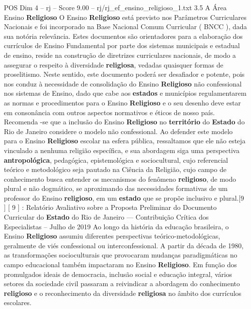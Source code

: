 \begin{textsample}{POS Dim 4 – rj – Score 9.00 – rj/rj\_ef\_ensino\_religioso\_1.txt}  \label{ex:f4_pos_165}
3.5 A Área Ensino \textbf{Religioso} O Ensino \textbf{Religioso} está previsto nos Parâmetros Curriculares Nacionais e foi incorporado na Base Nacional Comum Curricular ( BNCC ), dada sua notória relevância.
Estes documentos são orientadores para a elaboração dos currículos de Ensino Fundamental por parte dos sistemas municipais e estadual de ensino, reside na construção de diretrizes curriculares nacionais, de modo a assegurar o respeito à diversidade \textbf{religiosa}, vedadas quaisquer formas de proselitismo.
Neste sentido, este documento poderá ser desafiador e potente, pois nos conduz à necessidade de consolidação do Ensino \textbf{Religioso} não confessional nos sistemas de Ensino, dado que cabe aos \textbf{estados} e municípios regulamentarem as normas e procedimentos para o Ensino \textbf{Religioso} e o seu desenho deve estar em consonância com outros aspectos normativos e éticos de nosso país.
Recomenda -se que a inclusão do Ensino \textbf{Religioso} no \textbf{território} do \textbf{Estado} do Rio de Janeiro considere o modelo não confessional.
Ao defender este modelo para o Ensino \textbf{Religioso} escolar na esfera pública, ressaltamos que ele não esteja vinculado a nenhuma religião específica, e sua abordagem siga uma perspectiva \textbf{antropológica}, pedagógica, epistemológica e sociocultural, cujo referencial teórico e metodológico seja pautado na Ciência da Religião, cujo campo de conhecimento busca entender os mecanismos do fenômeno \textbf{religioso}, de modo plural e não dogmático, se aproximando das necessidades formativas de um professor do Ensino \textbf{religioso}, em um \textbf{estado} que se propõe inclusivo e plural.[9 ] [ 9 ] : Relatório Avaliativo sobre a Proposta Preliminar do Documento Curricular do \textbf{Estado} do Rio de Janeiro — Contribuição Crítica dos Especialistas – Julho de 2019 Ao longo da história da educação brasileira, o Ensino \textbf{Religioso} assumiu diferentes perspectivas teórico-metodológicas, geralmente de viés confessional ou interconfessional.
A partir da década de 1980, as transformações socioculturais que provocaram mudanças paradigmáticas no campo educacional também impactaram no Ensino \textbf{Religioso}.
Em função dos promulgados ideais de democracia, inclusão social e educação integral, vários setores da sociedade civil passaram a reivindicar a abordagem do conhecimento \textbf{religioso} e o reconhecimento da diversidade \textbf{religiosa} no âmbito dos currículos escolares.

\end{textsample}
